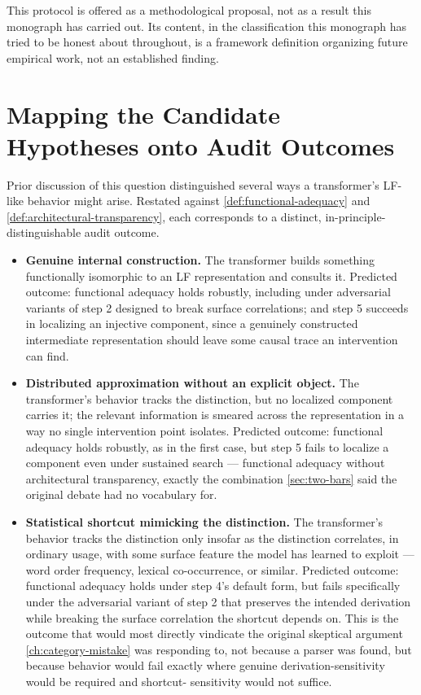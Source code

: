 \documentclass[11pt]{book}
\theoremstyle{plain}
\theoremstyle{definition}
\theoremstyle{remark}
\begin{document}
This protocol is offered as a methodological proposal, not as a result
this monograph has carried out. Its content, in the classification
this monograph has tried to be honest about throughout, is a framework
definition organizing future empirical work, not an established
finding.

\section{Mapping the Candidate Hypotheses onto Audit Outcomes}

Prior discussion of this question distinguished several ways a
transformer's LF-like behavior might arise. Restated against
\cref{def:functional-adequacy} and \cref{def:architectural-transparency},
each corresponds to a distinct, in-principle-distinguishable audit
outcome.

\begin{itemize}
\item \textbf{Genuine internal construction.} The transformer builds
something functionally isomorphic to an LF representation and
consults it. Predicted outcome: functional adequacy holds robustly,
including under adversarial variants of step 2 designed to break
surface correlations; and step 5 succeeds in localizing an injective
component, since a genuinely constructed intermediate representation
should leave some causal trace an intervention can find.
\item \textbf{Distributed approximation without an explicit object.}
The transformer's behavior tracks the distinction, but no
localized component carries it; the relevant information is smeared
across the representation in a way no single intervention point
isolates. Predicted outcome: functional adequacy holds robustly, as
in the first case, but step 5 fails to localize a component even under
sustained search --- functional adequacy without architectural
transparency, exactly the combination \cref{sec:two-bars} said the
original debate had no vocabulary for.
\item \textbf{Statistical shortcut mimicking the distinction.} The
transformer's behavior tracks the distinction only insofar as the
distinction correlates, in ordinary usage, with some surface feature
the model has learned to exploit --- word order frequency, lexical
co-occurrence, or similar. Predicted outcome: functional adequacy
holds under step 4's default form, but fails specifically under the
adversarial variant of step 2 that preserves the intended derivation
while breaking the surface correlation the shortcut depends on. This
is the outcome that would most directly vindicate the original
skeptical argument \cref{ch:category-mistake} was responding to, not
because a parser was found, but because behavior would fail exactly
where genuine derivation-sensitivity would be required and shortcut-
sensitivity would not suffice.
\end{itemize}
\end{document}
